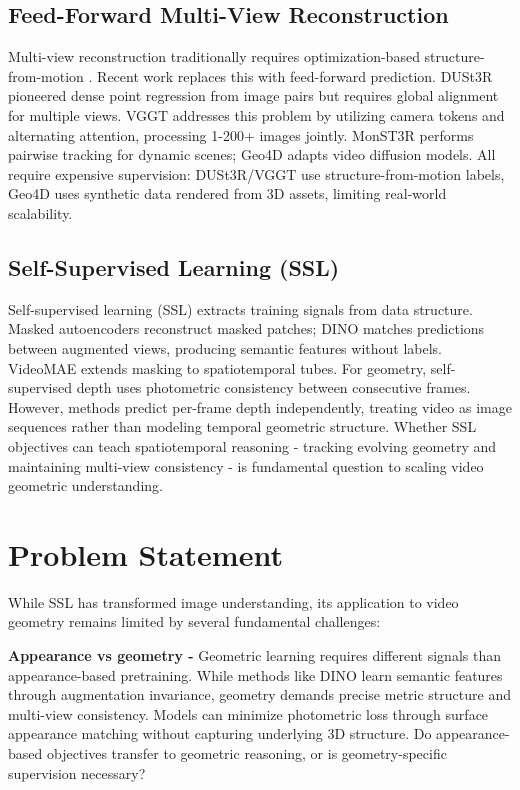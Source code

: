 \documentclass{article}
\begin{document}
\subsection{Feed-Forward Multi-View Reconstruction}

Multi-view reconstruction traditionally requires optimization-based structure-from-motion 
\cite{sfm}. Recent work replaces this with feed-forward prediction. 
DUSt3R \cite{DUSt3R} pioneered dense point regression from image pairs but requires 
global alignment for multiple views. VGGT \cite{vggt} addresses this problem by utilizing camera tokens 
and alternating attention, processing 1-200+ images jointly. MonST3R \cite{MonST3R} 
performs pairwise tracking for dynamic scenes; Geo4D \cite{geo4d} adapts video diffusion 
models. All require expensive supervision: DUSt3R/VGGT use structure-from-motion labels, 
Geo4D uses synthetic data rendered from 3D assets, limiting real-world scalability.

\vspace{-0.5cm}
\subsection{Self-Supervised Learning (SSL)}

Self-supervised learning (SSL) extracts training signals from data structure. Masked 
autoencoders \cite{mae} reconstruct masked patches; DINO \cite{dino,dinov2} matches 
predictions between augmented views, producing semantic features without labels. 
VideoMAE \cite{videomae} extends masking to spatiotemporal tubes. For geometry, 
self-supervised depth \cite{godard2019,watson2021} uses photometric consistency between 
consecutive frames. However, methods predict per-frame depth independently, treating video as image sequences 
rather than modeling temporal geometric structure. Whether SSL objectives can teach 
spatiotemporal reasoning - tracking evolving geometry and maintaining multi-view 
consistency - is fundamental question to scaling video geometric understanding.


\section{Problem Statement}

While SSL has transformed image understanding, its application 
to video geometry remains limited by several fundamental challenges:

\textbf{Appearance vs geometry - }Geometric learning requires different signals than appearance-based pretraining. While methods like DINO learn semantic features through augmentation invariance, geometry demands precise metric structure and multi-view consistency. Models can minimize photometric loss through surface appearance matching without capturing underlying 3D structure. Do appearance-based objectives transfer to geometric reasoning, or is geometry-specific supervision necessary?
\end{document}
